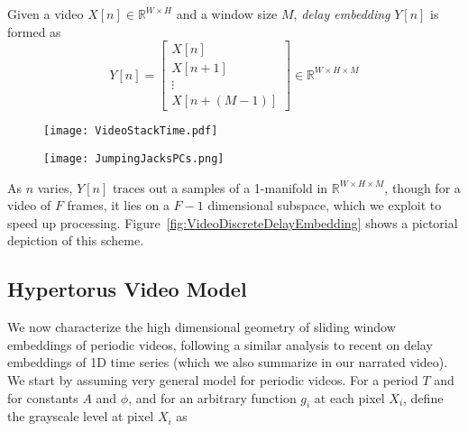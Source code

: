 \documentclass[a4paper,UKenglish]{lipics-v2016}
\begin{document}
\begin{definition}
Given a video $X[n] \in \mathbb{R}^{W \times H}$ and a window size $M$, {\em delay embedding} $Y[n]$ is formed as 
\begin{equation}
Y[n] = \left[ \begin{array}{c} X[n] \\ X[n + 1] \\ \vdots \\ X[n + (M-1)] \end{array} \right] \in \mathbb{R}^{W \times H \times M}
\end{equation}
\end{definition}

\begin{figure}
\begin{minipage}{0.4\textwidth}
	\centering
	\texttt{[image: VideoStackTime.pdf]}
	\label{fig:VideoDiscreteDelayEmbedding}
\end{minipage}
\begin{minipage}{0.5\textwidth}
	\centering
	\texttt{[image: JumpingJacksPCs.png]}
	\label{fig:JumpingJacksPCs}
\end{minipage}
\end{figure}

As $n$ varies, $Y[n]$ traces out a samples of a 1-manifold in $\mathbb{R}^{W \times H \times M}$, though for a video of $F$ frames, it lies on a $F-1$ dimensional subspace, which we exploit to speed up processing. Figure~\ref{fig:VideoDiscreteDelayEmbedding} shows a pictorial depiction of this scheme.

\subsection{Hypertorus Video Model}
\label{sec:VideoModel}


We now characterize the high dimensional geometry of sliding window embeddings of periodic videos, following a similar analysis to recent on delay embeddings of 1D time series \cite{perea2013sliding} (which we also summarize in our narrated video).  We start by assuming very general model for periodic videos.  For a period $T$ and for constants $A$ and $\phi$, and for an arbitrary function $g_i$ at each pixel $X_i$, define the grayscale level at pixel $X_i$ as 
\end{document}

